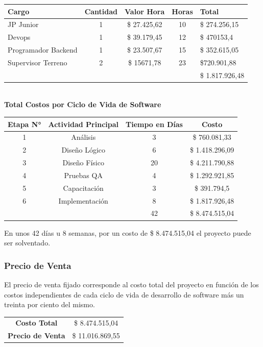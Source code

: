 \documentclass[12pt]{article}
\begin{document}
\begin{table}[!h]
    \centering
    \begin{tabular}{|p{4cm}|c|c|c|p{3cm}|}
         \hline
         Cargo & Cantidad & Valor Hora & Horas & Total\\
         \hline
         JP Junior & 1 & \$ 27.425,62 & 10 & \$ 274.256,15 \\
         Devops & 1 & \$ 39.179,45 & 12 & \$ 470153,4 \\
         Programador Backend & 1 & \$ 23.507,67 & 15 & \$ 352.615,05 \\
         Supervisor Terreno & 2 & \$ 15671,78 & 23 & \$720.901,88 \\
         \hline
         & & & & \$ 1.817.926,48 \\
         \hline
    \end{tabular}
\end{table}\\
\textbf{Total Costos por Ciclo de Vida de Software}
\begin{table}[!h]
    \centering
    \begin{tabular}{|c|c|c|c|}
        \hline
         \textbf{Etapa N°} & \textbf{Actividad Principal} & \textbf{Tiempo en Días} & \textbf{Costo} \\
         \hline
          1 & Análisis & 3 & \$ 760.081,33 \\
          2 & Diseño Lógico & 6 & \$ 1.418.296,09 \\
          3 & Diseño Físico & 20 & \$ 4.211.790,88 \\
          4 & Pruebas QA & 4 & \$ 1.292.921,85 \\
          5 & Capacitación & 3 & \$ 391.794,5 \\
          6 & Implementación & 8 & \$ 1.817.926,48 \\
          \hline
            & & 42 & \$ 8.474.515,04 \\
          \hline
    \end{tabular}
\end{table}
En unos 42 días u 8 semanas, por un costo de \$ 8.474.515,04 el proyecto puede ser solventado. 
\subsubsection{Precio de Venta}
El precio de venta fijado corresponde al costo total del proyecto en función de los costos independientes de cada ciclo de vida de desarrollo de software más un treinta por ciento del mismo.
\begin{table}[!h]
    \centering
    \begin{tabular}{c|c}
         \textbf{Costo Total} & \$ 8.474.515,04 \\
         \textbf{Precio de Venta} & \$ 11.016.869,55 \\ 
    \end{tabular}
\end{table}
\end{document}
